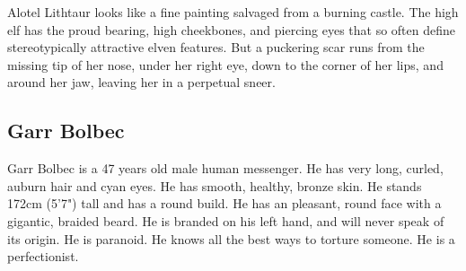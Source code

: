   \begin{aloud}
  \label{description:alotel}
  Alotel Lithtaur looks like a fine painting salvaged from a burning castle.
  The high elf has the proud bearing, high cheekbones, and piercing eyes that so often define
    stereotypically attractive elven features.
  But a puckering scar runs from the missing tip of her nose, under her right eye, down to the
    corner of her lips, and around her jaw, leaving her in a perpetual sneer.
  \end{aloud}

\subsection{Garr Bolbec}

Garr Bolbec is a 47 years old male human messenger.
He has very long, curled, auburn hair and cyan eyes.
He has smooth, healthy, bronze skin.
He stands 172cm (5'7") tall and has a round build.
He has an pleasant, round face with a gigantic, braided beard.
He is branded on his left hand, and will never speak of its origin.
He is paranoid.
He knows all the best ways to torture someone.
He is a perfectionist.
